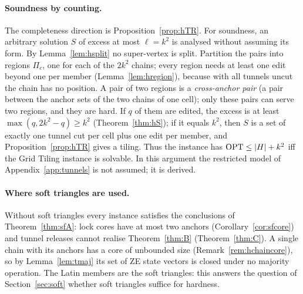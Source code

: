 \paragraph{Soundness by counting.} The completeness direction is Proposition~\ref{prop:hTR}. For soundness, an arbitrary solution $S$ of excess at most $\ell=k^2$ is analysed without assuming its form. By Lemma~\ref{lem:hsplit} no super-vertex is split. Partition the pairs into regions $\Pi_c$, one for each of the $2k^2$ chains; every region needs at least one edit beyond one per member (Lemma~\ref{lem:hregion}), because with all tunnels uncut the chain has no position. A pair of two regions is a \emph{cross-anchor pair} (a pair between the anchor sets of the two chains of one cell); only these pairs can serve two regions, and they are hard. If $q$ of them are edited, the excess is at least $\max(q,2k^2-q)\ge k^2$ (Theorem~\ref{thm:hS}); if it equals $k^2$, then $S$ is a set of exactly one tunnel cut per cell plus one edit per member, and Proposition~\ref{prop:hTR} gives a tiling. Thus the instance has $\mathrm{OPT}\le|H|+k^2$ iff the Grid Tiling instance is solvable. In this argument the restricted model of Appendix~\ref{app:tunnels} is not assumed; it is derived.

\paragraph{Where soft triangles are used.} Without soft triangles every instance satisfies the conclusions of Theorem~\ref{thm:sfA}: lock cores have at most two anchors (Corollary~\ref{cor:sfcore}) and tunnel releases cannot realise Theorem~\ref{thm:B} (Theorem~\ref{thm:C}). A single chain with its anchors has a core of unbounded size (Remark~\ref{rem:hchaincore}), so by Lemma~\ref{lem:tmaj} its set of ZE state vectors is closed under no majority operation. The Latin members are the soft triangles: this answers the question of Section~\ref{sec:soft} whether soft triangles suffice for hardness.

